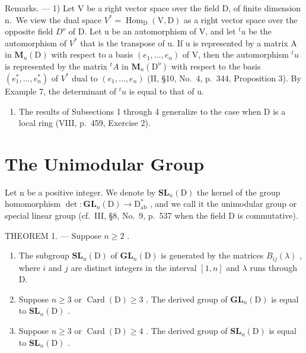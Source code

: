 Remarks. --- 1) Let V be a right vector space over the field D, of finite dimension n.~We view the dual space \(V^{*} = \operatorname{Hom}_{\mathrm{D}}(\mathrm{V}, \mathrm{D})\) as a right vector space over the opposite field \(D^{o}\) of D. Let u be an automorphism of V, and let \(^{t}u\) be the automorphism of \(V^{*}\) that is the transpose of u. If u is represented by a matrix A in \(\mathbf{M}_{n}(\mathrm{D})\) with respect to a basis \((e_{1}, \ldots, e_{n})\) of V, then the automorphism \(^{t}u\) is represented by the matrix \(^{t}A\) in \(\mathbf{M}_{n}(\mathrm{D}^{o})\) with respect to the basis \((e_{1}^{*}, \ldots, e_{n}^{*})\) of \(V^{*}\) dual to \((e_{1}, \ldots, e_{n})\) (II, §10, No.~4, p.~344, Proposition 3). By Example 7, the determinant of \(^{t}u\) is equal to that of u.

\begin{enumerate}
\def\labelenumi{\arabic{enumi})}
\setcounter{enumi}{1}
\tightlist
\item
  The results of Subsections 1 through 4 generalize to the case when D is a local ring (VIII, p.~459, Exercise 2).
\end{enumerate}

\section{The Unimodular Group}

Let n be a positive integer. We denote by \(\mathbf{SL}_{n}(\mathrm{D})\) the kernel of the group homomorphism \(\det: \mathbf{GL}_{n}(\mathrm{D}) \to \mathrm{D}_{\mathrm{ab}}^{*}\) , and we call it the unimodular group or special linear group (cf.~III, §8, No.~9, p.~537 when the field D is commutative).

THEOREM 1. --- Suppose \(n \geqslant 2\) .

\begin{enumerate}
\def\labelenumi{\alph{enumi})}
\item
  The subgroup \(\mathbf{SL}_n(\mathrm{D})\) of \(\mathbf{GL}_n(\mathrm{D})\) is generated by the matrices \(B_{ij}(\lambda)\) , where \(i\) and \(j\) are distinct integers in the interval \([1,n]\) and \(\lambda\) runs through D.
\item
  Suppose \(n \geqslant 3\) or \(\operatorname{Card}(\mathrm{D}) \geqslant 3\) . The derived group of \(\mathbf{GL}_n(\mathrm{D})\) is equal to \(\mathbf{SL}_n(\mathrm{D})\) .
\item
  Suppose \(n \geqslant 3\) or \(\operatorname{Card}(\mathrm{D}) \geqslant 4\) . The derived group of \(\mathbf{SL}_n(\mathrm{D})\) is equal to \(\mathbf{SL}_n(\mathrm{D})\) .
\end{enumerate}

